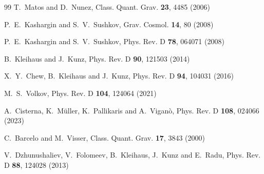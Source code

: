\documentclass[aps,prd,12pt,superscriptaddress]{revtex4-2}
\begin{document}
\begin{thebibliography}{99}
T.~Matos and D.~Nunez,
Class. Quant. Grav. \textbf{23}, 4485 (2006)

P.~E.~Kashargin and S.~V.~Sushkov,
Grav. Cosmol. \textbf{14}, 80 (2008)

P.~E.~Kashargin and S.~V.~Sushkov,
Phys. Rev. D \textbf{78}, 064071 (2008)

B.~Kleihaus and J.~Kunz,
Phys. Rev. D \textbf{90}, 121503 (2014)

X.~Y.~Chew, B.~Kleihaus and J.~Kunz,
Phys. Rev. D \textbf{94}, 104031 (2016)

M.~S.~Volkov,
Phys. Rev. D \textbf{104}, 124064 (2021)

A.~Cisterna, K.~M\"uller, K.~Pallikaris and A.~Vigan\`o,
Phys. Rev. D \textbf{108}, 024066 (2023)

C.~Barcelo and M.~Visser,
Class. Quant. Grav. \textbf{17}, 3843 (2000)

V.~Dzhunushaliev, V.~Folomeev, B.~Kleihaus, J.~Kunz and E.~Radu,
Phys. Rev. D \textbf{88}, 124028 (2013)


\end{thebibliography}
\end{document}
